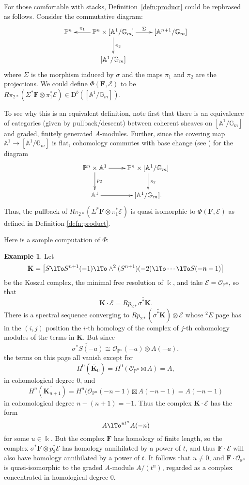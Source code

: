 \documentclass[12pt]{amsart}
\theoremstyle{definition}
\newtheorem{example}[lemma]{Example}
\theoremstyle{remark}
\newcommand{\Spec}{\operatorname{Spec}}
\newcommand{\kk}{\Bbbk}
\newcommand{\PP}{\mathbb{P}}
\renewcommand{\AA}{\mathbb{A}}
\newcommand{\GG}{\mathbb{G}}
\newcommand{\cO}{\mathcal{O}}
\newcommand{\cE}{\mathcal{E}}
\newcommand{\bK}{\mathbf{K}}
\newcommand{\FF}{\mathbf{F}}
\newcommand{\DD}{\mathrm{D}}
\begin{document}
For those comfortable with stacks, Definition~\ref{defn:product}
could be rephrased as follows. Consider the commutative diagram:
\[
\xymatrix{
\PP^n&\PP^{n}\times [\AA^1/\GG_m]\ar[l]_-{\pi_{1}} \ar[r]^-{\Sigma} \ar[d]^{\pi_2}&[\AA^{n+1}/\GG_m]\\
&[\AA^1/\GG_m]&%
}
\]
where $\Sigma$ is the morphism induced by $\sigma$ and the maps $\pi_1$ and $\pi_2$ are the projections.  We could define $\Phi(\FF,\cE)$ to be $R\pi_{2*}\left( \Sigma^*\FF\otimes \pi_{1}^{*}\cE\right)\in \DD^b([\AA^1/\GG_m])$.

To see why this is an equivalent definition, note first  that there is an equivalence of categories (given by pullback/descent) between coherent sheaves on $[\AA^1/\GG_m]$ and graded, finitely generated $A$-modules. Further, since the covering map $\AA^1\to [\AA^1/\GG_m]$ is flat, cohomology commutes with base change (see \cite[0765]{stacks-project}) for the diagram
\[
\xymatrix{
\PP^n\times \AA^1\ar[r]\ar[d]^-{p_2}&\PP^{n}\times [\AA^1/\GG_m]\ar[d]^{\pi_2}\\
\AA^1\ar[r]&[\AA^1/\GG_m].
}
\]
Thus, the pullback of $R\pi_{2*}\left( \Sigma^*\FF\otimes \pi_{1}^{*}\cE\right)$ is quasi-isomorphic 
to $\Phi(\FF,\cE)$ as defined in Definition \ref{defn:product}.

Here is a sample computation of $\Phi$: 

\begin{example} Let 
$$
\bK = \bigl[ S\lTo S^{n+1}(-1) \lTo \wedge^{2}(S^{n+1})(-2) \lTo\cdots\lTo S(-n-1)\bigr]
$$
be the Koszul complex, the minimal free resolution of $\kk$, and take
$\cE = \cO_{\PP^{n}}$, so that 
$$
\bK \cdot \cE = Rp_{2*}\widetilde {\sigma^{*}\bK}.
$$  
There is a spectral sequence converging to $Rp_{2*}(\widetilde {\sigma^{*}\bK})\otimes \cE$
whose $^{2}E$ page has in the $(i,j)$ position the $i$-th homology of the complex
of $j$-th cohomology modules of the terms in $\bK$. But since
$$
\widetilde {\sigma^{*} S(-a)} \cong \cO_{\PP^{n}}(-a)\otimes A(-a),
$$
the terms on this page all vanish except for
$$
H^{0} (\widetilde{\bK_{0}}) = H^{0}(\cO_{\PP^{n}}\boxtimes A) = A,
$$
in cohomological degree 0, and 
$$
H^{n}(\widetilde{\bK_{n+1}}) = H^{n}(\cO_{\PP^{n}}(-n-1)\boxtimes A(-n-1) = A(-n-1)
$$
in cohomological degree $n-(n+1) = -1$.
Thus the complex $\bK \cdot \cE$ has the form
$$
A\lTo^{ut^{n}}A(-n)
$$
for some $u\in \kk$. But the complex $\FF$ has homology of finite length, so the complex $\sigma^{*}\FF \otimes p_{2}^{*}\cE$ has homology annihilated by a power of $t$, and thus $\FF\cdot \cE$ will also have homology annihilated by a power of $t$. It follows that $u\neq 0$, and $\FF\cdot \cO_{\PP^{n}}$ is quasi-isomorphic to the graded $A$-module $A/(t^{n})$, regarded as a complex concentrated in homological degree 0.
\end{example}
\end{document}
